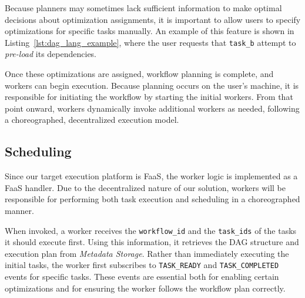 \documentclass[conference]{IEEEtran}
\begin{document}
Because planners may sometimes lack sufficient information to make optimal decisions about optimization assignments, it is important to allow users to specify optimizations for specific tasks manually. An example of this feature is shown in Listing~\ref{lst:dag_lang_example}, where the user requests that \texttt{task\_b} attempt to \textit{pre-load} its dependencies.

Once these optimizations are assigned, workflow planning is complete, and workers can begin execution. Because planning occurs on the user's machine, it is responsible for initiating the workflow by starting the initial workers. From that point onward, workers dynamically invoke additional workers as needed, following a choreographed, decentralized execution model.


\subsection{Scheduling}

Since our target execution platform is FaaS, the worker logic is implemented as a FaaS handler. Due to the decentralized nature of our solution, workers will be responsible for performing both task execution and scheduling in a choreographed manner. 

When invoked, a worker receives the \texttt{workflow\_id} and the \texttt{task\_ids} of the tasks it should execute first. Using this information, it retrieves the DAG structure and execution plan from \textit{Metadata Storage}. Rather than immediately executing the initial tasks, the worker first subscribes to \texttt{TASK\_READY} and \texttt{TASK\_COMPLETED} events for specific tasks. These events are essential both for enabling certain optimizations and for ensuring the worker follows the workflow plan correctly.
\end{document}
